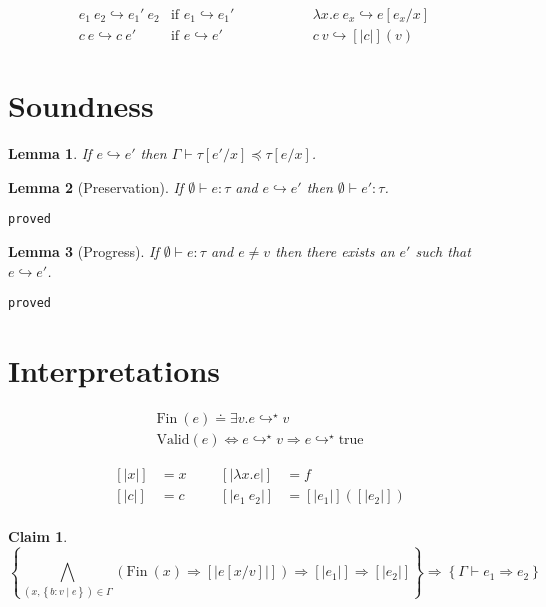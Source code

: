 \documentclass[10pt,a4paper]{article}
\newtheorem{lemma}{Lemma}
\newtheorem{claim}{Claim}
\newcommand\showproof[1]{\texttt{proved}}
\newcommand\efun[2]{\ensuremath{\lambda #1 . #2}}
\newcommand\eapp[2]{\ensuremath{#1 \ #2}}
\newcommand\etrue{\ensuremath{\text{true}}}
\newcommand\tref[3]{\ensuremath{\left\lbrace #1 \colon #2 \mid #3 \right\rbrace}}
\newcommand\fin[1]{\ensuremath{\text{Fin}\ (#1)}}
\newcommand\valid[1]{\ensuremath{\text{Valid}(#1)}}
\newcommand\sub[2]{\ensuremath{\left[ #2 / #1 \right]}}
\newcommand\interp[1]{\ensuremath{[|#1|]}}
\newcommand\eval[2]{\ensuremath{#1 \hookrightarrow #2}}
\newcommand\evals[2]{\ensuremath{#1 \hookrightarrow^\star #2}}
\newcommand\hastype[3]{\ensuremath{#1 \vdash #2 \colon #3}}
\newcommand\issubtype[3]{\ensuremath{#1 \vdash #2 \preceq #3}}
\newcommand\issubref[3]{\ensuremath{#1 \vdash #2 \Rightarrow #3}}
\begin{document}
$$
\begin{array}{lllll}
\eval{\eapp{e_1}{e_2}}{\eapp{e_1'}{e_2}} & \text{if } \eval{e_1}{e_1'}&\qquad\qquad&
\eval{\eapp{\efun{x}{e}}{e_x}}{e\sub{x}{e_x}} &\\
\eval{\eapp{c}{e}}{\eapp{c}{e'}} & \text{if } \eval{e}{e'} &\qquad\qquad&
\eval{\eapp{c}{v}}{[|c|](v)} &
\end{array}
$$

\section*{Soundness}
\begin{lemma}\label{lemma:eval}
If \eval{e}{e'} then \issubtype{\Gamma}{\tau\sub{x}{e'}}{\tau\sub{x}{e}}.
\end{lemma}

\begin{lemma}[Preservation]\label{lemma:preservation}
If \hastype{\emptyset}{e}{\tau} and \eval{e}{e'} then \hastype{\emptyset}{e'}{\tau}.
\end{lemma}
\showproof{
	\begin{proof}
	
	\end{proof}
}
\begin{lemma}[Progress]\label{lemma:progress}
If \hastype{\emptyset}{e}{\tau} and $e \neq v$ then there exists an $e'$ such that \eval{e}{e'}.
\end{lemma}
\showproof{
	\begin{proof}
	
	\end{proof}
}

\section*{Interpretations}
\begin{align*}
\fin{e} \doteq \exists v. \evals{e}{v}\\
\valid{e} \Leftrightarrow \evals{e}{v}\Rightarrow\evals{e}{\etrue}
\end{align*}

\begin{align*}
\interp{x}&=x &&&
\interp{\efun{x}{e}}&=f\\
\interp{c}&=c &&&
\interp{\eapp{e_1}{e_2}}&=\interp{e_1}(\interp{e_2})\\
\end{align*}



\begin{claim}
$$
\left\lbrace	
	\bigwedge_{(x,\tref{b}{v}{e})\in\Gamma}(\fin{x}\Rightarrow \interp{e\sub{v}{x}})
	\Rightarrow \interp{e_1}
	\Rightarrow \interp{e_2}
\right\rbrace
\Rightarrow
\left\lbrace	
\issubref{\Gamma}{e_1}{e_2}
\right\rbrace
$$
\end{claim}
\end{document}
